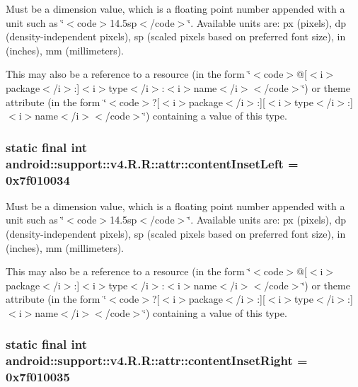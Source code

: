 Must be a dimension value, which is a floating point number appended with a unit such as \char`\"{}$<$code$>$14.5sp$<$/code$>$\char`\"{}. Available units are: px (pixels), dp (density-independent pixels), sp (scaled pixels based on preferred font size), in (inches), mm (millimeters). 

This may also be a reference to a resource (in the form \char`\"{}$<$code$>$@\mbox{[}$<$i$>$package$<$/i$>$:\mbox{]}$<$i$>$type$<$/i$>$:$<$i$>$name$<$/i$>$$<$/code$>$\char`\"{}) or theme attribute (in the form \char`\"{}$<$code$>$?\mbox{[}$<$i$>$package$<$/i$>$:\mbox{]}\mbox{[}$<$i$>$type$<$/i$>$:\mbox{]}$<$i$>$name$<$/i$>$$<$/code$>$\char`\"{}) containing a value of this type. \hypertarget{classandroid_1_1support_1_1v4_1_1_r_1_1attr_f9b033fa8f4c522a96539cb694057069}{
\subsubsection[{contentInsetLeft}]{\setlength{\rightskip}{0pt plus 5cm}static final int android::support::v4.R.R::attr::contentInsetLeft = 0x7f010034}}
\label{classandroid_1_1support_1_1v4_1_1_r_1_1attr_f9b033fa8f4c522a96539cb694057069}


Must be a dimension value, which is a floating point number appended with a unit such as \char`\"{}$<$code$>$14.5sp$<$/code$>$\char`\"{}. Available units are: px (pixels), dp (density-independent pixels), sp (scaled pixels based on preferred font size), in (inches), mm (millimeters). 

This may also be a reference to a resource (in the form \char`\"{}$<$code$>$@\mbox{[}$<$i$>$package$<$/i$>$:\mbox{]}$<$i$>$type$<$/i$>$:$<$i$>$name$<$/i$>$$<$/code$>$\char`\"{}) or theme attribute (in the form \char`\"{}$<$code$>$?\mbox{[}$<$i$>$package$<$/i$>$:\mbox{]}\mbox{[}$<$i$>$type$<$/i$>$:\mbox{]}$<$i$>$name$<$/i$>$$<$/code$>$\char`\"{}) containing a value of this type. \hypertarget{classandroid_1_1support_1_1v4_1_1_r_1_1attr_3b8cccc0efcc6274b878754350944b7b}{
\subsubsection[{contentInsetRight}]{\setlength{\rightskip}{0pt plus 5cm}static final int android::support::v4.R.R::attr::contentInsetRight = 0x7f010035}}
\label{classandroid_1_1support_1_1v4_1_1_r_1_1attr_3b8cccc0efcc6274b878754350944b7b}


